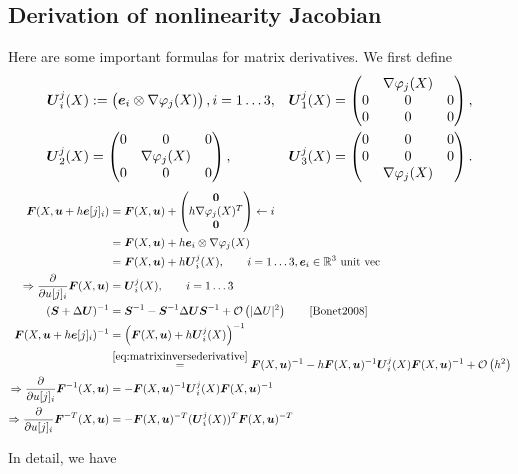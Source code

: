 \subsection{Derivation of nonlinearity Jacobian}
Here are some important formulas for matrix derivatives. We first define
\begin{align}
    \boldsymbol{U}^j_i(X) & := \left(\begin{matrix}\boldsymbol{e}_i\otimes\nabla\varphi_{j}(X)\end{matrix}\right), i=1\ldots3, &
	\boldsymbol{U}^j_1(X) &= \left(\begin{matrix}
            ~   & \nabla\varphi_{j}(X)  & ~ \\
            0   & 0                 & 0 \\
            0   & 0                 & 0
          \end{matrix}\right),\\
  \boldsymbol{U}^j_2(X) &= \left(\begin{matrix}
            0   & 0                 & 0 \\
            ~   & \nabla\varphi_{j}(X)  & ~ \\            
            0   & 0                 & 0
          \end{matrix}\right),& 
  \boldsymbol{U}^j_3(X) & = \left(\begin{matrix}
            0   & 0                 & 0 \\
            0   & 0                 & 0 \\
            ~   & \nabla\varphi_{j}(X)  & ~            
          \end{matrix}\right).
\end{align}
\begin{align}
	\vF(X,\vu + h\ve[j]_i) &= \vF(X,\vu) + \m{\vnull \\ h\dpj^T\\ \vnull}\leftarrow i\nonumber\\
	&= \vF(X,\vu) + h\ve_i\otimes\dpj\\
	&= \vF(X,\vu) + h\vU^j_i(X),\qquad i=1\ldots3,\ve_i\in\R^3 \text{ unit vec}\nonumber\\
	\Rightarrow \d{}{u[j]_i}\vF(X,\vu) &= \vU^j_i(X),\qquad i=1\ldots3\nonumber\\
	(\vS+\Delta\vU)^{-1} &= \vS^{-1} - \vS^{-1}\Delta\vU\vS^{-1} + \O{|\Delta U|^2}\qquad\cite[p.57]{Bonet2008}\label{eq:matrixinversederivative}\\
	\vF(X,\vu + h\ve[j]_i)^{-1} &= \left(\vF(X,\vu) + h\vU^j_i(X)\right)^{-1}\nonumber\\
		&\re{eq:matrixinversederivative}\vF(X,\vu)^{-1} - h\vF(X,\vu)^{-1}\vU^j_i(X)\vF(X,\vu)^{-1} + \O{h^2}\nonumber\\
	\Rightarrow\d{}{u[j]_i}\vF^{-1}(X,\vu) &= -\vF(X,\vu)^{-1}\vU^j_i(X)\vF(X,\vu)^{-1}\nonumber\\
	\Rightarrow\d{}{u[j]_i}\vF^{-T}(X,\vu) &= -\vF(X,\vu)^{-T}(\vU^j_i(X))^{T}\vF(X,\vu)^{-T}\nonumber
\end{align}

In detail, we have
